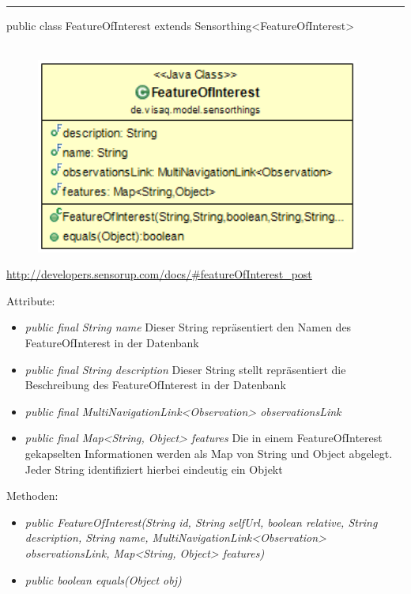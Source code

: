 \rule{\textwidth}{0.4pt}
public class FeatureOfInterest extends Sensorthing<FeatureOfInterest>
\\\\
\begin{minipage}{0.4\textwidth}
    \begin{figure}[H]
        {\centering\includegraphics[width=0.95\textwidth]{media/backend/modell/classes/FeatureOfInterest.png}}
    \end{figure}
    \end{minipage} \hfill
\begin{minipage}{0.6\textwidth}
    \url{http://developers.sensorup.com/docs/#featureOfInterest_post}
\end{minipage}

Attribute:
\begin{itemize}
    \item \emph{public final String name} Dieser String repräsentiert den Namen des FeatureOfInterest in der Datenbank
    \item \emph{public final String description} Dieser String stellt repräsentiert die Beschreibung des FeatureOfInterest in der Datenbank
    \item \emph{public final MultiNavigationLink<Observation> observationsLink} 
    \item \emph{public final Map<String, Object> features} Die in einem FeatureOfInterest gekapselten Informationen werden als Map von String und Object abgelegt.
    Jeder String identifiziert hierbei eindeutig ein Objekt
\end{itemize}
Methoden:
\begin{itemize}
    \item \emph{public FeatureOfInterest(String id, String selfUrl, boolean relative, String description, String name, MultiNavigationLink<Observation> observationsLink, Map<String, Object> features)}
    \item \emph{public boolean equals(Object obj)} 
\end{itemize}

